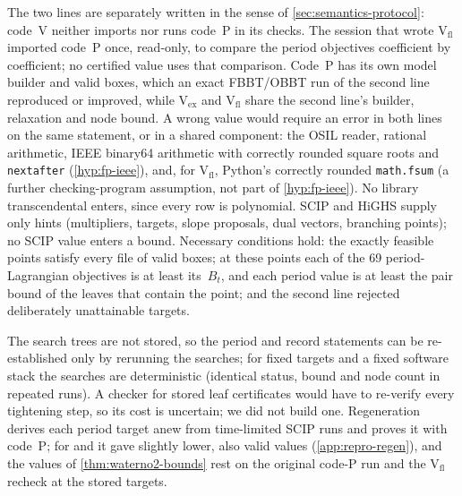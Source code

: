 The two lines are separately written in the sense of \cref{sec:semantics-protocol}: code~V neither imports nor runs code~P in its checks.
The session that wrote V$_{\mathrm{fl}}$ imported code~P once, read-only, to compare the period objectives coefficient by coefficient; no certified value uses that comparison.
Code~P has its own model builder and valid boxes, which an exact FBBT/OBBT run of the second line reproduced or improved, while V$_{\mathrm{ex}}$ and V$_{\mathrm{fl}}$ share the second line's builder, relaxation and node bound.
A wrong value would require an error in both lines on the same statement, or in a shared component: the OSIL reader, rational arithmetic, IEEE binary64 arithmetic with correctly rounded square roots and \texttt{nextafter} (\cref{hyp:fp-ieee}), and, for V$_{\mathrm{fl}}$, Python's correctly rounded \texttt{math.fsum} (a further checking-program assumption, not part of \cref{hyp:fp-ieee}).
No library transcendental enters, since every row is polynomial.
SCIP and HiGHS supply only hints (multipliers, targets, slope proposals, dual vectors, branching points); no SCIP value enters a bound.
Necessary conditions hold: the exactly feasible points satisfy every file of valid boxes; at these points each of the 69 period-Lagrangian objectives is at least its~$B_t$, and each  period value is at least the pair bound of the leaves that contain the point; and the second line rejected deliberately unattainable targets.

The search trees are not stored, so the period and record statements can be re-established only by rerunning the searches; for fixed targets and a fixed software stack the searches are deterministic (identical status, bound and node count in repeated runs).
A checker for stored leaf certificates would have to re-verify every tightening step, so its cost is uncertain; we did not build one.
Regeneration derives each period target anew from time-limited SCIP runs and proves it with code~P; for  and  it gave slightly lower, also valid values (\cref{app:repro-regen}), and the values of \cref{thm:waterno2-bounds} rest on the original code-P run and the V$_{\mathrm{fl}}$ recheck at the stored targets.


